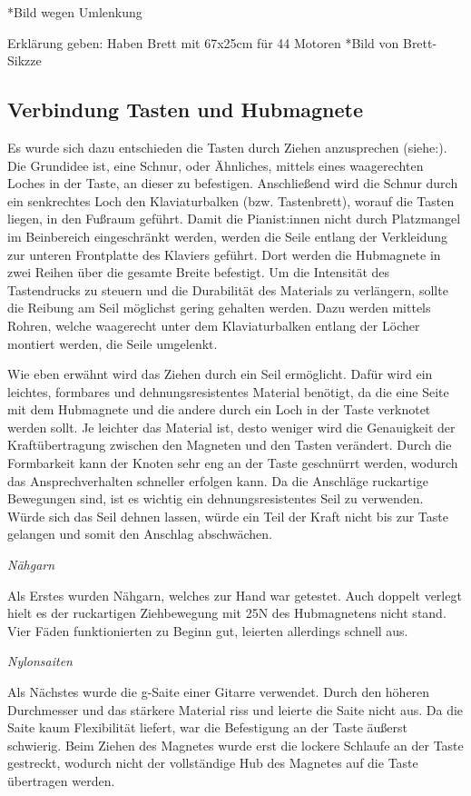 *Bild wegen Umlenkung

Erklärung geben: Haben Brett mit 67x25cm für 44 Motoren
*Bild von Brett-Sikzze



\subsection{Verbindung Tasten und Hubmagnete}

Es wurde sich dazu entschieden die Tasten durch Ziehen anzusprechen (siehe:).
Die Grundidee ist, eine Schnur, oder Ähnliches, mittels eines waagerechten Loches in der Taste, an dieser zu befestigen.
Anschließend wird die Schnur durch ein senkrechtes Loch den Klaviaturbalken (bzw. Tastenbrett), worauf die Tasten liegen, in den Fußraum geführt.
Damit die Pianist:innen nicht durch Platzmangel im Beinbereich eingeschränkt werden, werden die Seile entlang der Verkleidung zur unteren Frontplatte des Klaviers geführt.
Dort werden die Hubmagnete in zwei Reihen über die gesamte Breite befestigt.
Um die Intensität des Tastendrucks zu steuern und die Durabilität des Materials zu verlängern, sollte die Reibung am Seil möglichst gering gehalten werden.
Dazu werden mittels Rohren, welche waagerecht unter dem Klaviaturbalken entlang der Löcher montiert werden, die Seile umgelenkt.


Wie eben erwähnt wird das Ziehen durch ein Seil ermöglicht.
Dafür wird ein leichtes, formbares und dehnungsresistentes Material benötigt, da die eine Seite mit dem Hubmagnete und die andere durch ein Loch in der Taste verknotet werden sollt.
Je leichter das Material ist, desto weniger wird die Genauigkeit der Kraftübertragung zwischen den Magneten und den Tasten verändert.
Durch die Formbarkeit kann der Knoten sehr eng an der Taste geschnürrt werden, wodurch das Ansprechverhalten schneller erfolgen kann.
Da die Anschläge ruckartige Bewegungen sind, ist es wichtig ein dehnungsresistentes Seil zu verwenden.
Würde sich das Seil dehnen lassen, würde ein Teil der Kraft nicht bis zur Taste gelangen und somit den Anschlag abschwächen.

\textit{Nähgarn}

Als Erstes wurden Nähgarn, welches zur Hand war getestet.
Auch doppelt verlegt hielt es der ruckartigen Ziehbewegung mit 25N des Hubmagnetens nicht stand.
Vier Fäden funktionierten zu Beginn gut, leierten allerdings schnell aus.

\textit{Nylonsaiten}

Als Nächstes wurde die g-Saite einer Gitarre verwendet.
Durch den höheren Durchmesser und das stärkere Material riss und leierte die Saite nicht aus.
Da die Saite kaum Flexibilität liefert, war die Befestigung an der Taste äußerst schwierig.
Beim Ziehen des Magnetes wurde erst die lockere Schlaufe an der Taste gestreckt, wodurch nicht der vollständige Hub des Magnetes auf die Taste übertragen werden.

